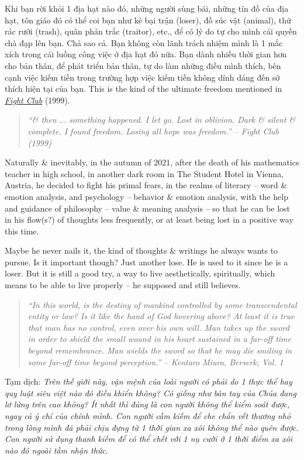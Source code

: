 \documentclass[12pt]{article}
\begin{document}
Khi bạn rời khỏi 1 địa hạt nào đó, những người sùng bái, những tín đồ của địa hạt, tôn giáo đó có thể coi bạn như kẻ bại trận (loser), đồ súc vật (animal), thứ rác rưởi (trash), quân phản trắc (traitor), etc., để có lý do tự cho mình cái quyền chà đạp lên bạn. Chả sao cả. Bạn không còn lãnh trách nhiệm mình là 1 mắc xích trong cái luồng công việc ở địa hạt đó nữa. Bạn dành nhiều thời gian hơn cho bản thân, để phát triển bản thân, tự do làm những điều mình thích, bên cạnh việc kiếm tiền trong trường hợp việc kiếm tiền không dính dáng đến sở thích hiện tại của bạn. This is the kind of the ultimate freedom mentioned in \href{https://www.imdb.com/title/tt0137523}{\it Fight Club} (1999).
\begin{quote}\it
	``\& then $\ldots$ something happened. I let go. Lost in oblivion. Dark \& silent \& complete. I found freedom. Losing all hope was freedom.'' -- Fight Club (1999)
\end{quote}
Naturally \& inevitably, in the autumn of 2021, after the death of his mathematics teacher in high school, in another dark room in The Student Hotel in Vienna, Austria, he decided to fight his primal fears, in the realms of literary -- word \& emotion analysis, and psychology -- behavior \& emotion analysis, with the help and guidance of philosophy -- value \& meaning analysis -- so that he can be lost in his flow(s?) of thoughts less frequently, or at least being lost in a positive way this time.

Maybe he never nails it, the kind of thoughts \& writings he always wants to pursue. Is it important though? Just another lose. He is used to it since he is a loser. But it is still a good try, a way to live aesthetically, spiritually, which means to be able to live properly -- he supposed and still believes.

\begin{quotation}\it
	``In this world, is the destiny of mankind controlled by some transcendental entity or law? Is it like the hand of God hovering above? At least it is true that man has no control, even over his own will. Man takes up the sword in order to shield the small wound in his heart sustained in a far-off time beyond remembrance. Man wields the sword so that he may die smiling in some far-off time beyond perception.'' -- {\sc Kentaro Miura}, {\it Berserk}, Vol. 1
\end{quotation}
Tạm dịch: {\it Trên thế giới này, vận mệnh của loài người có phải do 1 thực thể hay quy luật siêu việt nào đó điều khiển không? Có giống như bàn tay của Chúa đang lơ lửng trên cao không? Ít nhất thì đúng là con người không thể kiểm soát được, ngay cả ý chí của chính mình. Con người cầm kiếm để che chắn vết thương nhỏ trong lòng mình đã phải chịu đựng từ 1 thời gian xa xôi không thể nào quên được. Con người sử dụng thanh kiếm để có thể chết với 1 nụ cười ở 1 thời điểm xa xôi nào đó ngoài tầm nhận thức}.
\end{document}
